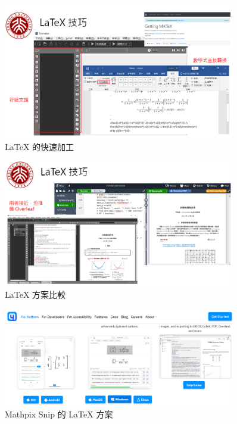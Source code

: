 \begin{figure}[htb]
\centering 
\includegraphics[width=0.90\textwidth]{img/c3m1.png} 
\caption{LaTeX 的快速加工}
\label{Test}
\end{figure}

\begin{figure}[htb]
\centering 
\includegraphics[width=0.90\textwidth]{img/c3m2.png} 
\caption{LaTeX 方案比較}
\label{Test}
\end{figure}

\begin{figure}[htb]
\centering 
\includegraphics[width=0.90\textwidth]{img/c3m3.png} 
\caption{Mathpix Snip 的 LaTeX 方案}
\label{Test}
\end{figure}

